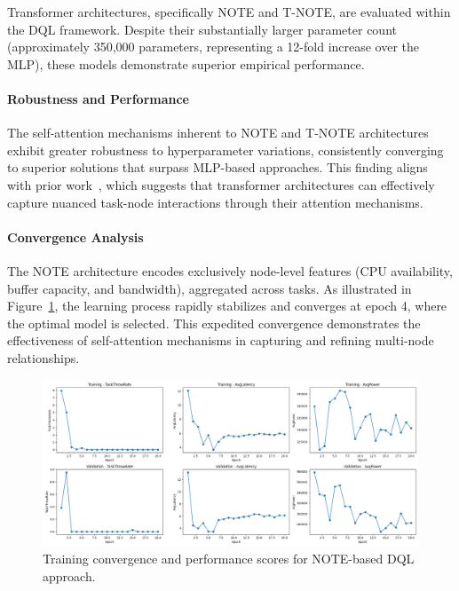 \documentclass[preprint,3p,authoryear]{elsarticle}
\begin{document}
Transformer architectures, specifically NOTE and T-NOTE, are evaluated within the DQL framework. Despite their substantially larger parameter count (approximately 350,000 parameters, representing a 12-fold increase over the MLP), these models demonstrate superior empirical performance.

\paragraph{Robustness and Performance}

The self-attention mechanisms inherent to NOTE and T-NOTE architectures exhibit greater robustness to hyperparameter variations, consistently converging to superior solutions that surpass MLP-based approaches. This finding aligns with prior work~\cite{gholipour_tpto_2023}, which suggests that transformer architectures can effectively capture nuanced task-node interactions through their attention mechanisms.

\paragraph{Convergence Analysis}

The NOTE architecture encodes exclusively node-level features (CPU availability, buffer capacity, and bandwidth), aggregated across tasks. As illustrated in Figure~\ref{fig:NOTE-score-plot}, the learning process rapidly stabilizes and converges at epoch 4, where the optimal model is selected. This expedited convergence demonstrates the effectiveness of self-attention mechanisms in capturing and refining multi-node relationships.

\begin{figure}[H]
    \centering
    \includegraphics[width=1\linewidth]{figs/NOTE/score_plot.png}
    \caption{Training convergence and performance scores for NOTE-based DQL approach.}
    \label{fig:NOTE-score-plot}
\end{figure}
\end{document}
